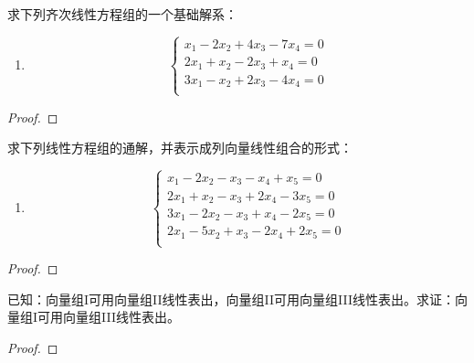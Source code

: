 \begin{problem}
求下列齐次线性方程组的一个基础解系：
\begin{enumerate}
    \item
          {
          \begin{equation*}
              \begin{cases}
                  x_1-2x_2+4x_3-7x_4=0 \\
                  2x_1+x_2-2x_3+x_4=0  \\
                  3x_1-x_2+2x_3-4x_4=0 \\
              \end{cases}
          \end{equation*}
          }
\end{enumerate}
\end{problem}
\begin{proof}

\end{proof}

\begin{problem}
求下列线性方程组的通解，并表示成列向量线性组合的形式：
\begin{enumerate}
    \item
          {
          \begin{equation*}
              \begin{cases}
                  x_1-2x_2-x_3-x_4+x_5=0    \\
                  2x_1+x_2-x_3+2x_4-3x_5=0  \\
                  3x_1-2x_2-x_3+x_4-2x_5=0  \\
                  2x_1-5x_2+x_3-2x_4+2x_5=0 \\
              \end{cases}
          \end{equation*}
          }
\end{enumerate}
\end{problem}
\begin{proof}

\end{proof}

\begin{problem}
已知：向量组I可用向量组II线性表出，向量组II可用向量组III线性表出。求证：向量组I可用向量组III线性表出。
\end{problem}
\begin{proof}

\end{proof}

